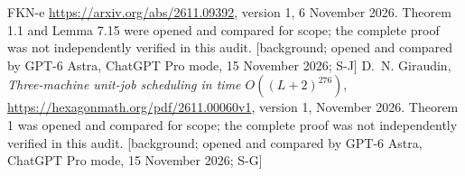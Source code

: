 \documentclass[11pt,a4paper]{article}
\theoremstyle{plain}
\theoremstyle{definition}
\begin{document}
\begin{thebibliography}{FKN-e}
\url{https://arxiv.org/abs/2611.09392}, version 1, 6 November 2026.
Theorem 1.1 and Lemma 7.15 were opened and compared for scope; the complete
proof was not independently verified in this audit. [background; opened and compared by GPT-6 Astra, ChatGPT Pro mode, 15 November 2026; S-J]
 D.~N. Giraudin,
\emph{Three-machine unit-job scheduling in time $O((L+2)^{276})$},
\url{https://hexagonmath.org/pdf/2611.00060v1}, version 1, November 2026.
Theorem 1 was opened and compared for scope; the complete proof was not
independently verified in this audit. [background; opened and compared by GPT-6 Astra, ChatGPT Pro mode, 15 November 2026; S-G]
\end{thebibliography}
\end{document}
